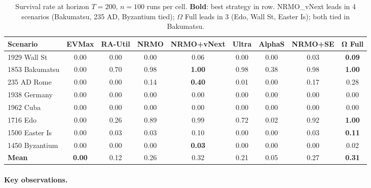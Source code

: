 \begin{table}[ht]
\centering
\scriptsize
\renewcommand{\arraystretch}{1.05}
\begin{tabularx}{\linewidth}{Xcccccccc}
\toprule
\textbf{Scenario} & \textbf{EVMax} & \textbf{RA-Util} &
\textbf{NRMO} & \textbf{NRMO+vNext} & \textbf{Ultra} &
\textbf{AlphaS} & \textbf{NRMO+SE} & \textbf{$\boldsymbol\Omega$ Full} \\
\midrule
1929 Wall St & 0.00 & 0.00 & 0.00 & 0.06 & 0.00 & 0.00 & 0.03 & \textbf{0.09} \\
1853 Bakumatsu & 0.00 & 0.70 & 0.98 & \textbf{1.00} & 0.98 & 0.38 & 0.98 & \textbf{1.00} \\
235 AD Rome & 0.00 & 0.00 & 0.14 & \textbf{0.40} & 0.01 & 0.00 & 0.17 & 0.28 \\
1938 Germany & 0.00 & 0.00 & 0.00 & 0.00 & 0.00 & 0.00 & 0.00 & 0.00 \\
1962 Cuba & 0.00 & 0.00 & 0.00 & 0.00 & 0.00 & 0.00 & 0.00 & 0.00 \\
1716 Edo & 0.00 & 0.26 & 0.89 & 0.99 & 0.72 & 0.02 & 0.92 & \textbf{1.00} \\
1500 Easter Is & 0.00 & 0.03 & 0.03 & 0.10 & 0.00 & 0.00 & 0.03 & \textbf{0.11} \\
1450 Byzantium & 0.00 & 0.00 & 0.00 & \textbf{0.03} & 0.00 & 0.00 & 0.00 & 0.02 \\
\midrule
\textbf{Mean} & \textbf{0.00} & 0.12 & 0.26 & 0.32 & 0.21 & 0.05 & 0.27 & \textbf{0.31} \\
\bottomrule
\end{tabularx}
\caption[Per-scenario survival rates]{Survival rate at horizon
$T = 200$, $n = 100$ runs per cell. \textbf{Bold}: best strategy
in row. NRMO\_vNext leads in 4 scenarios (Bakumatsu, 235 AD,
Byzantium tied); $\Omega$ Full leads in 3 (Edo, Wall St, Easter
Is); both tied in Bakumatsu.}
\label{tab:hist-survival}
\end{table}

\paragraph{Key observations.}

